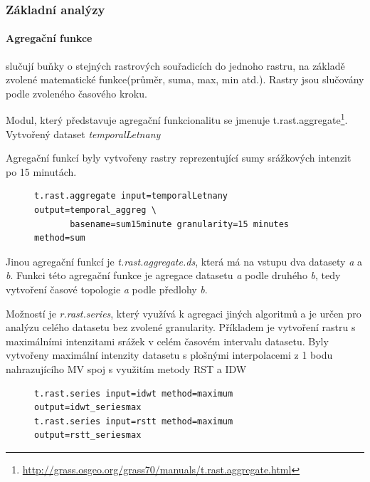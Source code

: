\documentclass[a4paper,12pt,oneside]{report}
\begin{document}
\subsubsection*{Základní analýzy}
\label{subsubsec:casoprostoranal} 


\paragraph{Agregační funkce} slučují buňky o stejných rastrových souřadicích do jednoho rastru, na základě zvolené matematické funkce(průměr, suma, max, min atd.). Rastry jsou slučovány podle zvoleného časového kroku.

Modul, který představuje agregační funkcionalitu se jmenuje t.rast.aggregate\footnote{\url{http://grass.osgeo.org/grass70/manuals/t.rast.aggregate.html}}.  Vytvořený dataset \emph{temporalLetnany}

Agregační funkcí byly vytvořeny rastry reprezentující sumy srážkových intenzit po 15 minutách.
\begin{figure}[h!]
\begin{footnotesize}
\lstset{extendedchars=false,
escapeinside=''}
\begin{lstlisting}[style=mybash]
t.rast.aggregate input=temporalLetnany output=temporal_aggreg \
       basename=sum15minute granularity=15 minutes method=sum
\end{lstlisting}
\end{footnotesize} 
\end{figure}
Jinou agregační funkcí je \textit{t.rast.aggregate.ds}, která má na vstupu dva datasety \emph{a} a \emph{b}. Funkci této agregační funkce je agregace  datasetu \emph{a} podle druhého\emph{ b}, tedy vytvoření časové topologie \emph{a} podle předlohy \emph{b}.



Možností je \textit{r.rast.series}, který využívá k agregaci jiných algoritmů a je určen pro analýzu celého datasetu bez zvolené granularity.
Příkladem je vytvoření rastru s maximálními intenzitami srážek v celém časovém intervalu datasetu. Byly vytvořeny maximální intenzity datasetu s plošnými interpolacemi z 1 bodu nahrazujícího MV spoj s využitím metody RST a IDW


\begin{figure}[h!]
\begin{footnotesize}
\lstset{extendedchars=false,
escapeinside=''}
\begin{lstlisting}[style=mybash]
t.rast.series input=idwt method=maximum output=idwt_seriesmax           
t.rast.series input=rstt method=maximum output=rstt_seriesmax    
\end{lstlisting}
\end{footnotesize} 
\end{figure}
\end{document}
